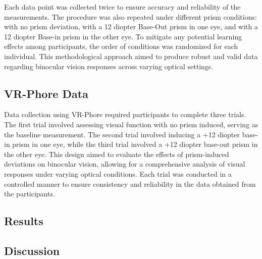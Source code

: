 \documentclass{article}
\begin{document}
Each data point was collected twice to ensure accuracy and reliability of the measurements. The procedure was also repeated under different prism conditions: with no prism deviation, with a 12 diopter Base-Out prism in one eye, and with a 12 diopter Base-in prism in the other eye. To mitigate any potential learning effects among participants, the order of conditions was randomized for each individual. This methodological approach aimed to produce robust and valid data regarding binocular vision responses across varying optical settings.

\subsection{VR-Phore Data}

Data collection using VR-Phore required participants to complete three trials. The first trial involved assessing visual function with no prism induced, serving as the baseline measurement. The second trial involved inducing a +12 diopter base-in prism in one eye, while the third trial involved a +12 diopter base-out prism in the other eye. This design aimed to evaluate the effects of prism-induced deviations on binocular vision, allowing for a comprehensive analysis of visual responses under varying optical conditions. Each trial was conducted in a controlled manner to ensure consistency and reliability in the data obtained from the participants.

\subsection{Results}

\subsection{Discussion}
\end{document}
